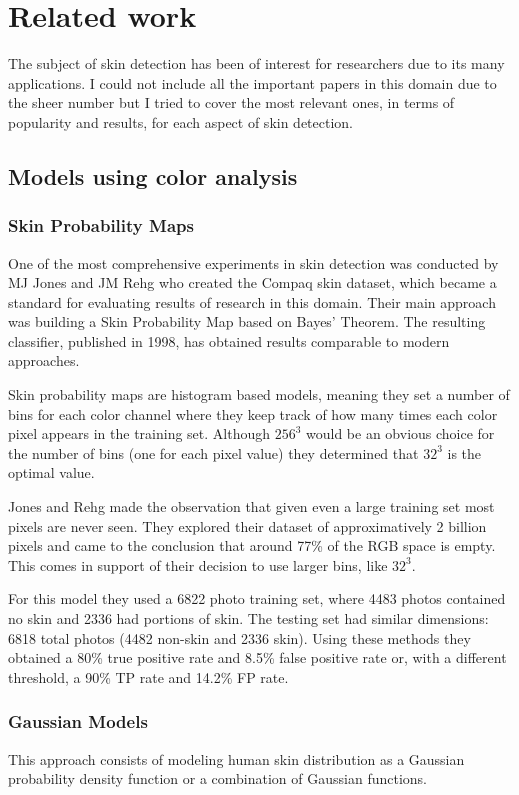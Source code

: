 \documentclass[12pt]{report}
\begin{document}
	\section{Related work}
	The subject of skin detection has been of interest for researchers due to its many applications. I could not include all the important papers in this domain due to the sheer number but I tried to cover the most relevant ones, in terms of popularity and results, for each aspect of skin detection.
	
	\subsection{Models using color analysis}
	
	\subsubsection{Skin Probability Maps}
	One of the most comprehensive experiments in skin detection was conducted by MJ Jones and JM Rehg\cite{compaq} who created the Compaq skin dataset, which became a standard for evaluating results of research in this domain. Their main approach was building a Skin Probability Map based on Bayes' Theorem. The resulting classifier, published in 1998, has obtained results comparable to modern approaches.
	
	Skin probability maps are histogram based models, meaning they set a number of bins for each color channel where they keep track of how many times each color pixel appears in the training set. Although \(256^3\) would be an obvious choice for the number of bins (one for each pixel value) they determined that \(32^3\) is the optimal value.
	
	Jones and Rehg\cite{compaq} made the observation that given even a large training set most pixels are never seen. They explored their dataset of approximatively 2 billion pixels and came to the conclusion that around 77\% of the RGB space is empty. This comes in support of their decision to use larger bins, like \(32^3\).
	
	For this model they used a 6822 photo training set, where 4483 photos contained no skin and 2336 had portions of skin. The testing set had similar dimensions: 6818 total photos (4482 non-skin and 2336 skin). Using these methods they obtained a 80\% true positive rate and 8.5\% false positive rate or, with a different threshold, a 90\% TP rate and 14.2\% FP rate.
	
	\subsubsection{Gaussian Models}
	This approach consists of modeling human skin distribution as a Gaussian probability density function or a combination of Gaussian functions.
	
\end{document}
